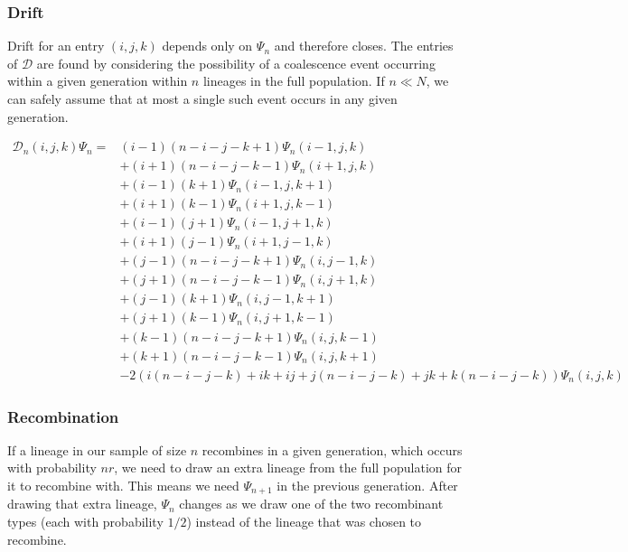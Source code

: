 \documentclass[]{article}
\begin{document}
\subsubsection{Drift}\label{drift}

Drift for an entry \((i, j, k)\) depends only on \(\Psi_n\) and therefore closes.
The entries of \(\mathcal{D}\) are found by considering the possibility of a
coalescence event occurring within a given generation within \(n\) lineages in
the full population. If \(n \ll N\), we can safely assume that at most a single
such event occurs in any given generation.

\begin{align}
\mathcal{D}_{n}(i, j, k)\Psi_n =
& (i - 1) (n - i - j - k + 1) \Psi_n(i - 1, j, k) \\\nonumber
& + (i + 1) (n - i - j - k - 1) \Psi_n(i + 1, j, k) \\\nonumber
& + (i - 1) (k + 1) \Psi_n(i - 1, j, k + 1) \\\nonumber
& + (i + 1) (k - 1) \Psi_n(i + 1, j, k - 1) \\\nonumber
& + (i - 1) (j + 1) \Psi_n(i - 1, j + 1, k) \\\nonumber
& + (i + 1) (j - 1) \Psi_n(i + 1, j - 1, k) \\\nonumber
& + (j - 1) (n - i - j - k + 1) \Psi_n(i, j - 1, k) \\\nonumber
& + (j + 1) (n - i - j - k - 1) \Psi_n(i, j + 1, k) \\\nonumber
& + (j - 1) (k + 1) \Psi_n(i, j - 1, k + 1) \\\nonumber
& + (j + 1) (k - 1) \Psi_n(i, j + 1, k - 1) \\\nonumber
& + (k - 1) (n - i - j - k + 1) \Psi_n(i, j, k - 1) \\\nonumber
& + (k + 1) (n - i - j - k - 1) \Psi_n(i, j, k + 1) \\\nonumber
& - 2\left( i ( n - i - j - k) + i k + i j + j (n - i - j - k) + j k + k(n - i - j - k)\right)\Psi_n(i, j, k)
\end{align}

\subsubsection{Recombination}\label{recombination}

If a lineage in our sample of size \(n\) recombines in a given generation, which
occurs with probability \(nr\), we need to draw an extra lineage from the full
population for it to recombine with. This means we need \(\Psi_{n+1}\) in the
previous generation. After drawing that extra lineage, \(\Psi_n\) changes as we
draw one of the two recombinant types (each with probability \(1/2\)) instead of
the lineage that was chosen to recombine.
\end{document}
